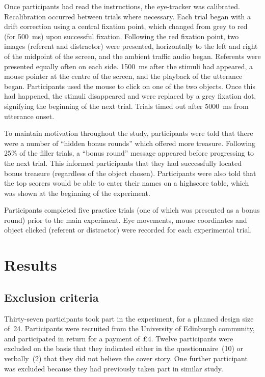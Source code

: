\documentclass[a4paper,man,natbib]{apa6}
\begin{document}
Once participants had read the instructions, the eye-tracker was calibrated.
Recalibration occurred between trials where necessary.
Each trial began with a drift correction using a central fixation point, which changed from grey to red (for 500~ms) upon successful fixation. 
Following the red fixation point, two images (referent and distractor) were presented, horizontally to the left and right of the midpoint of the screen, and the ambient traffic audio began.
Referents were presented equally often on each side.
1500~ms after the stimuli had appeared, a mouse pointer at the centre of the screen, and the playback of the utterance began.
Participants used the mouse to click on one of the two objects.
Once this had happened, the stimuli disappeared and were replaced by a grey fixation dot, signifying the beginning of the next trial. 
Trials timed out after 5000~ms from utterance onset.


To maintain motivation throughout the study, participants were told that there were a number of ``hidden bonus rounds'' which offered more treasure. 
Following 25\% of the filler trials, a ``bonus round'' message appeared before progressing to the next trial.
This informed participants that they had successfully located bonus treasure (regardless of the object chosen).
Participants were also told that the top scorers would be able to enter their names on a highscore table, which was shown at the beginning of the experiment. 

Participants completed five practice trials (one of which was presented as a bonus round) prior to the main experiment. 
Eye movements, mouse coordinates and object clicked (referent or distractor) were recorded for each experimental trial.


\section{Results}
\subsection{Exclusion criteria}
Thirty-seven participants took part in the experiment, for a planned design size of~24.
Participants were recruited from the University of Edinburgh community, and participated in return for a payment of \pounds{}4.
Twelve participants were excluded on the basis that they indicated either in the questionnaire~(10) or verbally~(2) that they did not believe the cover story.
One further participant was excluded because they had previously taken part in similar study.
\end{document}
